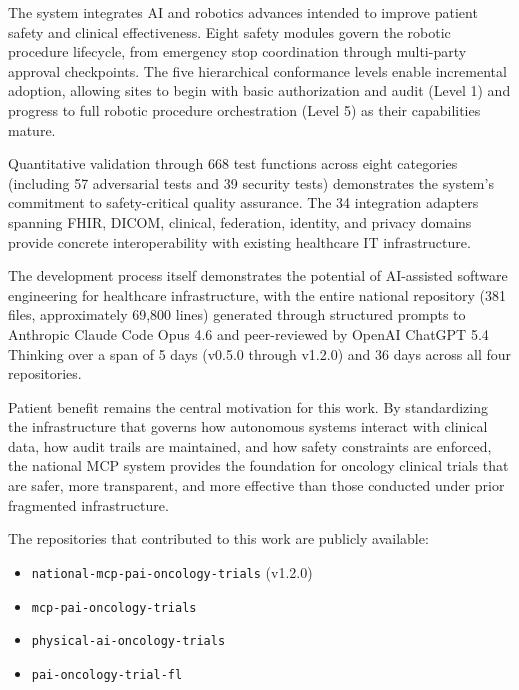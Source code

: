 \documentclass{article}
\begin{document}
The system integrates AI and robotics advances intended to improve patient safety and clinical effectiveness. Eight safety modules govern the robotic procedure lifecycle, from emergency stop coordination through multi-party approval checkpoints. The five hierarchical conformance levels enable incremental adoption, allowing sites to begin with basic authorization and audit (Level 1) and progress to full robotic procedure orchestration (Level 5) as their capabilities mature.

Quantitative validation through 668 test functions across eight categories (including 57 adversarial tests and 39 security tests) demonstrates the system's commitment to safety-critical quality assurance. The 34 integration adapters spanning FHIR, DICOM, clinical, federation, identity, and privacy domains provide concrete interoperability with existing healthcare IT infrastructure.

The development process itself demonstrates the potential of AI-assisted software engineering for healthcare infrastructure, with the entire national repository (381 files, approximately 69,800 lines) generated through structured prompts to Anthropic Claude Code Opus 4.6 and peer-reviewed by OpenAI ChatGPT 5.4 Thinking over a span of 5 days (v0.5.0 through v1.2.0) and 36 days across all four repositories.

Patient benefit remains the central motivation for this work. By standardizing the infrastructure that governs how autonomous systems interact with clinical data, how audit trails are maintained, and how safety constraints are enforced, the national MCP system provides the foundation for oncology clinical trials that are safer, more transparent, and more effective than those conducted under prior fragmented infrastructure.

The repositories that contributed to this work are publicly available:
\begin{itemize}[leftmargin=*]
\item \texttt{national-mcp-pai-oncology-trials} (v1.2.0)~\cite{kawchak2026national}
\item \texttt{mcp-pai-oncology-trials}~\cite{kawchak2026trialmcp}
\item \texttt{physical-ai-oncology-trials}~\cite{kawchak2026physicalai}
\item \texttt{pai-oncology-trial-fl}~\cite{kawchak2026paifl}
\end{itemize}



\end{document}

